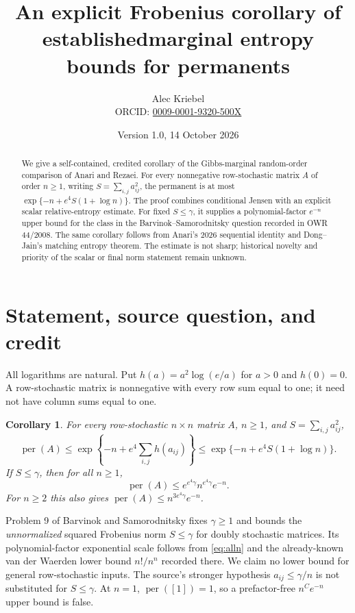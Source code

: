 \documentclass[11pt]{article}
\title{An explicit Frobenius corollary of established\newline marginal entropy bounds for permanents}
\author{Alec Kriebel\\\small ORCID: \href{https://orcid.org/0009-0001-9320-500X}{0009-0001-9320-500X}}
\date{Version 1.0, 14 October 2026}
\newtheorem{corollary}{Corollary}
\newcommand{\per}{\operatorname{per}}
\begin{document}
\maketitle
\begin{abstract}
We give a self-contained, credited corollary of the Gibbs-marginal random-order comparison of Anari and Rezaei. For every nonnegative row-stochastic matrix $A$ of order $n\ge1$, writing $S=\sum_{i,j}a_{ij}^{2}$, the permanent is at most $\exp\{-n+e^4 S(1+\log n)\}$. The proof combines conditional Jensen with an explicit scalar relative-entropy estimate. For fixed $S\le\gamma$, it supplies a polynomial-factor $e^{-n}$ upper bound for the class in the Barvinok--Samorodnitsky question recorded in OWR 44/2008. The same corollary follows from Anari's 2026 sequential identity and Dong--Jain's matching entropy theorem. The estimate is not sharp; historical novelty and priority of the scalar or final norm statement remain unknown.
\end{abstract}

\section{Statement, source question, and credit}
All logarithms are natural. Put $h(a)=a^2\log(e/a)$ for $a>0$ and $h(0)=0$. A row-stochastic matrix is nonnegative with every row sum equal to one; it need not have column sums equal to one.

\begin{corollary}\label{cor:main}
For every row-stochastic $n\times n$ matrix $A$, $n\ge1$, and $S=\sum_{i,j}a_{ij}^2$,
\begin{equation}\label{eq:main}
 \per(A)\le \exp\left\{-n+e^4\sum_{i,j}h(a_{ij})\right\}
 \le \exp\{-n+e^4S(1+\log n)\}.
\end{equation}
If $S\le\gamma$, then for all $n\ge1$,
\begin{equation}\label{eq:alln}
 \per(A)\le e^{e^4\gamma}n^{e^4\gamma}e^{-n}.
\end{equation}
For $n\ge2$ this also gives $\per(A)\le n^{3e^4\gamma}e^{-n}$.
\end{corollary}

Problem 9 of Barvinok and Samorodnitsky \cite[pp.~2549--2550]{OWR} fixes $\gamma\ge1$ and bounds the \emph{unnormalized} squared Frobenius norm $S\le\gamma$ for doubly stochastic matrices. Its polynomial-factor exponential scale follows from \eqref{eq:alln} and the already-known van der Waerden lower bound $n!/n^n$ recorded there. We claim no lower bound for general row-stochastic inputs. The source's stronger hypothesis $a_{ij}\le\gamma/n$ is not substituted for $S\le\gamma$. At $n=1$, $\per([1])=1$, so a prefactor-free $n^Ce^{-n}$ upper bound is false.
\end{document}
